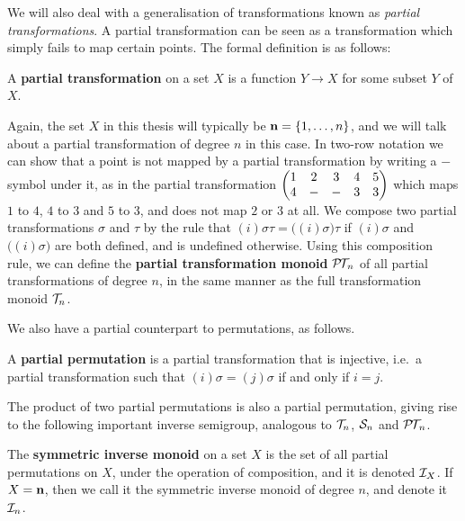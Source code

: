 We will also deal with a generalisation of transformations known as
\textit{partial transformations}.  A partial transformation can be seen as a
transformation which simply fails to map certain points.  The formal definition
is as follows:

\begin{definition}
  \label{def:partial-transformation}
  A \textbf{partial transformation} on a set $X$ is a function $Y \to X$ for
  some subset $Y$ of $X$.
\end{definition}

Again, the set $X$ in this thesis will typically be $\mathbf{n} = \{1, \ldots, n\}$,
and we will talk about a partial transformation of degree $n$ in this case.  In
two-row notation we can show that a point is not mapped by a partial
transformation by writing a $-$ symbol under it, as in the partial
transformation $\begin{pmatrix} 1 & 2 & 3 & 4 & 5 \\ 4 & - & - & 3 & 3 \end{pmatrix}$ which maps $1$ to $4$, $4$ to $3$ and $5$ to $3$,
and does not map $2$ or $3$ at all.  We compose two partial transformations
$\sigma$ and $\tau$ by the rule that $(i)\sigma\tau = \big((i)\sigma\big)\tau$
if $(i)\sigma$ and $\big((i)\sigma\big)$ are both defined, and is undefined
otherwise.  Using this composition rule, we can define the \textbf{partial
  transformation monoid} $\mathcal{P\!T\!}_n$ of all partial transformations of degree $n$,
in the same manner as the full transformation monoid $\mathcal{T}_n$.

We also have a partial counterpart to permutations, as follows.

\begin{definition}
  \label{def:partial-perm}
  A \textbf{partial permutation} is a partial transformation that is injective,
  i.e.~a partial transformation such that $(i)\sigma=(j)\sigma$ if and only if
  $i=j$.
\end{definition}

The product of two partial permutations is also a partial permutation, giving
rise to the following important inverse semigroup, analogous to $\mathcal{T}_n$, $\mathcal{S}_n$
and $\mathcal{P\!T\!}_n$.

\begin{definition}
  \label{def:in}
  The \textbf{symmetric inverse monoid} on a set $X$ is the set of all partial
  permutations on $X$, under the operation of composition, and it is denoted
  $\mathcal{I}_X$.  If $X = \mathbf{n}$, then we call it the symmetric inverse monoid of degree
  $n$, and denote it $\mathcal{I}_n$.
\end{definition}

